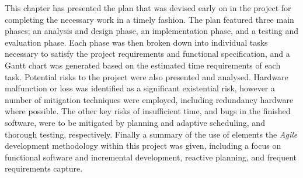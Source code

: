 This chapter has presented the plan that was devised early on in the project for completing the necessary work in a timely fashion. The plan featured three main phases; an analysis and design phase, an implementation phase, and a testing and evaluation phase. Each phase was then broken down into individual tasks necessary to satisfy the project requirements and functional specification, and a Gantt chart was generated based on the estimated time requirements of each task. Potential risks to the project were also presented and analysed. Hardware malfunction or loss was identified as a significant existential risk, however a number of mitigation techniques were employed, including redundancy hardware where possible. The other key risks of insufficient time, and bugs in the finished software, were to be mitigated by planning and adaptive scheduling, and thorough testing, respectively. Finally a summary of the use of elements the \textit{Agile} development methodology within this project was given, including a focus on functional software and incremental development, reactive planning, and frequent requirements capture.